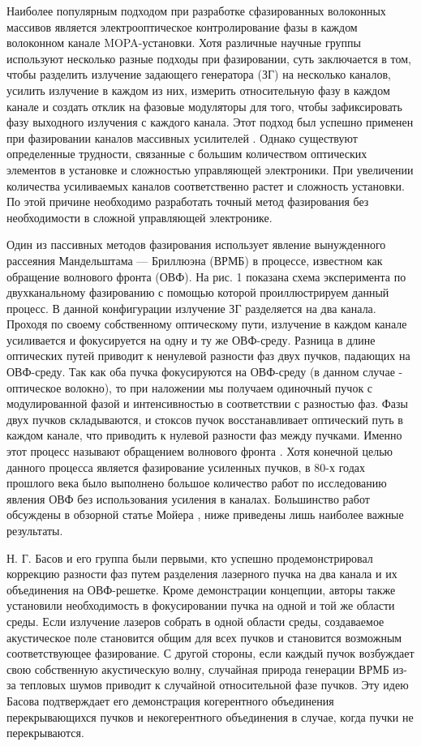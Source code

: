 Наиболее популярным подходом при разработке сфазированных волоконных
массивов является электрооптическое контролирование фазы в каждом
волоконном канале MOPA-установки. Хотя различные научные группы
используют несколько разные подходы при фазировании, суть
заключается в том, чтобы разделить излучение задающего генератора
(ЗГ) на несколько каналов, усилить излучение в каждом из них,
измерить относительную фазу в каждом канале и создать отклик на
фазовые модуляторы для того, чтобы зафиксировать фазу выходного
излучения с каждого канала. Этот подход был успешно применен при
фазировании каналов массивных усилителей \cite{121,122,123}. Однако
существуют определенные трудности, связанные с большим количеством
оптических элементов в установке и сложностью управляющей
электроники. При увеличении количества усиливаемых каналов
соответственно растет и сложность установки. По этой причине
необходимо разработать точный метод фазирования без необходимости в
сложной управляющей электронике.


Один из пассивных методов фазирования использует явление
вынужденного рассеяния Мандельштама --- Бриллюэна (ВРМБ) в процессе,
известном как обращение волнового фронта (ОВФ). На рис. 1 показана
схема эксперимента по двухканальному фазированию с помощью которой
проиллюстрируем данный процесс. В данной конфигурации излучение ЗГ
разделяется на два канала. Проходя по своему собственному
оптическому пути, излучение в каждом канале усиливается и
фокусируется на одну и ту же ОВФ-среду. Разница в длине оптических
путей приводит к ненулевой разности фаз двух пучков, падающих на
ОВФ-среду. Так как оба пучка фокусируются на ОВФ-среду (в данном
случае - оптическое волокно), то при наложении мы получаем одиночный
пучок с модулированной фазой и интенсивностью в соответствии с
разностью фаз. Фазы двух пучков складываются, и стоксов пучок
восстанавливает оптический путь в каждом канале, что приводить к
нулевой разности фаз между пучками. Именно этот процесс называют
обращением волнового фронта \cite{124,125}. Хотя конечной целью
данного процесса является фазирование усиленных пучков, в 80-х годах
прошлого века было выполнено большое количество работ по
исследованию явления ОВФ без использования усиления в каналах.
Большинство работ обсуждены в обзорной статье Мойера \cite{125},
ниже приведены лишь наиболее важные результаты.


Н. Г. Басов и его группа \cite{126} были первыми, кто успешно
продемонстрировал коррекцию разности фаз путем разделения лазерного
пучка на два канала и их объединения на ОВФ-решетке. Кроме
демонстрации концепции, авторы также установили необходимость в
фокусировании пучка на одной и той же области среды. Если излучение
лазеров собрать в одной области среды, создаваемое акустическое поле
становится общим для всех пучков и становится возможным
соответствующее фазирование. С другой стороны, если каждый пучок
возбуждает свою собственную акустическую волну, случайная природа
генерации ВРМБ из-за тепловых шумов приводит к случайной
относительной фазе пучков. Эту идею Басова подтверждает его
демонстрация когерентного объединения перекрывающихся пучков и
некогерентного объединения в случае, когда пучки не перекрываются.


